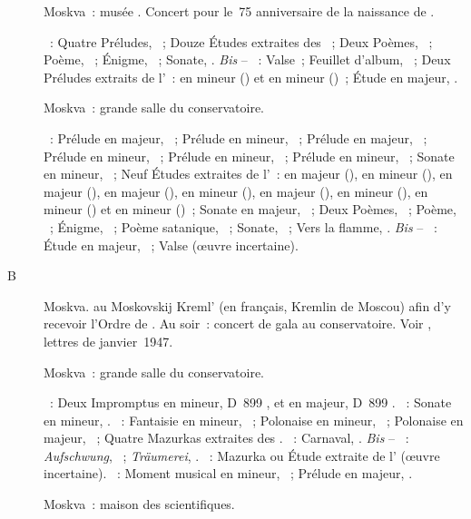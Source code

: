 \begin{description}
 \item[]
 Moskva~: musée \Scriabine{}.
 Concert pour le~75\ieme{} anniversaire de la naissance de \Scriabine{}.

 \textsc{\Scriabine{}}~: Quatre Préludes, ~; Douze Études extraites
 des ~; Deux Poèmes, ~; Poème,  ~;
 Énigme,  ~; Sonate, .
 \emph{Bis} -- \textsc{\Scriabine{}}~: Valse~; Feuillet d'album, 
 ~; Deux Préludes extraits de l'~: en \kE \Flat mineur
 () et en \kC \Sharp mineur ()~; Étude en \kD \Flat
 majeur,  .
 \item[]
 Moskva~: grande salle du conservatoire.

 \textsc{\Scriabine{}}~: Prélude en \kC majeur,  ~;
 Prélude en \kB mineur,  ~; Prélude en \kD \Flat majeur,
  ~; Prélude en \kB \Flat mineur,  ~;
 Prélude en \kG mineur,  ~; Prélude en \kB mineur,
  ~; Sonate en \kF \Sharp mineur, ~; Neuf Études
 extraites de l'~: en \kC \Sharp majeur (), en \kF \Sharp
 mineur (), en \kB majeur (), en \kE majeur
 (), en \kB \Flat mineur (), en \kA \Flat majeur
 (), en \kG \Sharp mineur (), en \kB \Flat mineur
 () et en \kD \Sharp mineur ()~; Sonate en \kF \Sharp
 majeur, ~; Deux Poèmes, ~; Poème,  ~;
 Énigme,  ~; Poème satanique, ~; Sonate,
 ~; Vers la flamme, .
 \emph{Bis} -- \textsc{\Scriabine{}}~: Étude en \kD \Flat majeur, 
 ~; Valse (œuvre incertaine).
 \item[B]
 Moskva.
 \VSofronitsky{} au Moskovskij Kreml' (en français, Kremlin de Moscou) afin
 d'y recevoir l'\hbox{Ordre} de \Lenin{}.
 Au soir~: concert de gala au conservatoire.
 Voir \citet[p.~167 et~168]{Nekrasova08}, lettres de janvier~1947.
 \item[]
 Moskva~: grande salle du conservatoire.

 \textsc{\Schubert{}}~: Deux Impromptus en \kC mineur, D~899 , et
 en \kA \Flat majeur, D~899 .
 \textsc{\Beethoven{}}~: Sonate en \kC \Sharp mineur,  .
 \textsc{\Chopin{}}~: Fantaisie en \kF mineur, ~; Polonaise en \kC
 \Sharp mineur,  ~; Polonaise en \kA majeur, 
 ~; Quatre Mazurkas extraites des .
 \textsc{\Schumann{}}~: Carnaval, .
 \emph{Bis} -- \textsc{\Schumann{}}~: \emph{Aufschwung}, 
 ~; \emph{Träumerei},  .
 \textsc{\Chopin{}}~: Mazurka ou Étude extraite de l' (œuvre
 incertaine).
 \textsc{\Rachmaninov{}}~: Moment musical en \kE \Flat mineur, 
 ~; Prélude en \kG majeur,  .
 \item[]
 Moskva~: maison des scientifiques.


\end{description}

